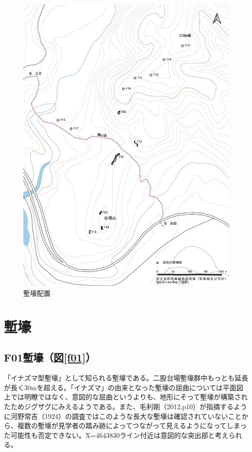 \documentclass[14Q]{jsarticle}
\begin{document}
\begin{figure}[h]
\centering
\includegraphics[width=160truemm]{fig/haitizu_tate.pdf}
\caption{塹壕配置}
\label{haiti_tate}
\end{figure}

\section{塹壕}
\subsection{F01塹壕（図\ref{f01}）}
「イナズマ型塹壕」として知られる塹壕である。二股台場塹壕群中もっとも延長が長く30mを超える。「イナズマ」の由来となった塹壕の屈曲については平面図上では明瞭ではなく、意図的な屈曲というよりも、地形にそって塹壕が構築されたためジグザグにみえるようである。また、毛利剛（2012,p10）が指摘するように河野常吉（1924）の調査ではこのような長大な塹壕は確認されていないことから、複数の塹壕が見学者の踏み跡によってつながって見えるようになってしまった可能性も否定できない。X=4643830ライン付近は意図的な突出部と考えられる。
\end{document}
